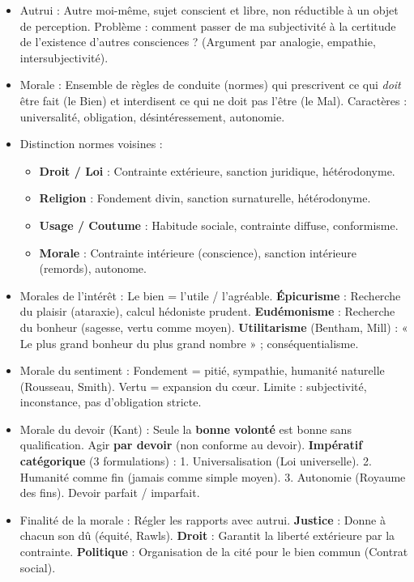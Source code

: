 \documentclass[11pt]{article}
\newcommand{\cle}[1]{{\popxbold\color{popdark}#1}}
\begin{document}
\begin{bilan}
\begin{itemize}
    \item \cle{Autrui} : Autre moi-même, sujet conscient et libre, non réductible à un objet de perception. Problème : comment passer de ma subjectivité à la certitude de l'existence d'autres consciences ? (Argument par analogie, empathie, intersubjectivité).
    \item \cle{Morale} : Ensemble de règles de conduite (normes) qui prescrivent ce qui \emph{doit} être fait (le Bien) et interdisent ce qui ne doit pas l'être (le Mal). Caractères : universalité, obligation, désintéressement, autonomie.
    \item \cle{Distinction normes voisines} :
    \begin{itemize}
        \item \textbf{Droit / Loi} : Contrainte extérieure, sanction juridique, hétérodonyme.
        \item \textbf{Religion} : Fondement divin, sanction surnaturelle, hétérodonyme.
        \item \textbf{Usage / Coutume} : Habitude sociale, contrainte diffuse, conformisme.
        \item \textbf{Morale} : Contrainte intérieure (conscience), sanction intérieure (remords), autonome.
    \end{itemize}
    \item \cle{Morales de l'intérêt} : Le bien = l'utile / l'agréable. \textbf{Épicurisme} : Recherche du plaisir (ataraxie), calcul hédoniste prudent. \textbf{Eudémonisme} : Recherche du bonheur (sagesse, vertu comme moyen). \textbf{Utilitarisme} (Bentham, Mill) : « Le plus grand bonheur du plus grand nombre » ; conséquentialisme.
    \item \cle{Morale du sentiment} : Fondement = pitié, sympathie, humanité naturelle (Rousseau, Smith). Vertu = expansion du cœur. Limite : subjectivité, inconstance, pas d'obligation stricte.
    \item \cle{Morale du devoir (Kant)} : Seule la \textbf{bonne volonté} est bonne sans qualification. Agir \textbf{par devoir} (non conforme au devoir). \textbf{Impératif catégorique} (3 formulations) : 1. Universalisation (Loi universelle). 2. Humanité comme fin (jamais comme simple moyen). 3. Autonomie (Royaume des fins). Devoir parfait / imparfait.
    \item \cle{Finalité de la morale} : Régler les rapports avec autrui. \textbf{Justice} : Donne à chacun son dû (équité, Rawls). \textbf{Droit} : Garantit la liberté extérieure par la contrainte. \textbf{Politique} : Organisation de la cité pour le bien commun (Contrat social).
\end{itemize}


\end{bilan}
\end{document}
